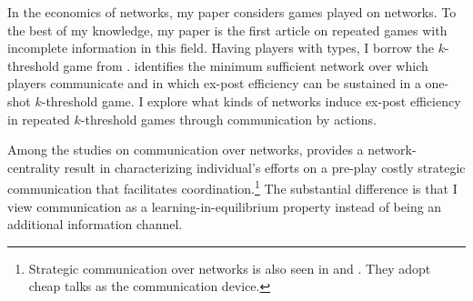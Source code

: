 \documentclass[12pt,letter]{article}
\theoremstyle{definition}
\theoremstyle{definition}
\theoremstyle{remark}
\theoremstyle{claim}
\begin{document}
In the economics of networks, my paper considers games played on networks. To the best of my knowledge, my paper is the first article on repeated games with incomplete information in this field. Having players with types, I borrow the $k$-threshold game from \citep{Chwe2000}. \citep{Chwe2000} identifies the minimum sufficient network over which players communicate and in which ex-post efficiency can be sustained in a one-shot $k$-threshold game. I explore what kinds of networks induce ex-post efficiency in repeated $k$-threshold games through communication by actions. 

Among the studies on communication over networks, \citep{Calvo2015} provides a network-centrality result in characterizing individual's efforts on a pre-play costly strategic communication that facilitates coordination.\footnote{Strategic communication over networks is also seen in \citep{Hagenbach2010} and \citep{Galeotti2010}. They adopt cheap talks as the communication device.} 
The substantial difference is that I view communication as a learning-in-equilibrium property instead of being an additional information channel.
\end{document}
